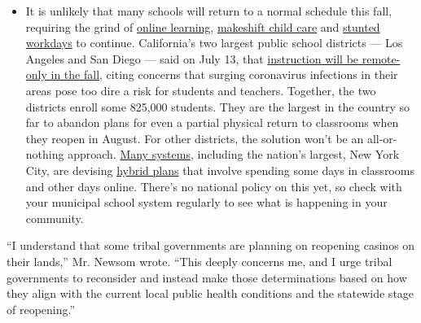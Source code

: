\begin{itemize}
  \begin{itemize}
  \tightlist
  \item
    It is unlikely that many schools will return to a normal schedule
    this fall, requiring the grind of
    \href{https://www.nytimes.com/2020/06/05/us/coronavirus-education-lost-learning.html?action=click\&pgtype=Article\&state=default\&region=MAIN_CONTENT_3\&context=storylines_faq}{online
    learning},
    \href{https://www.nytimes.com/2020/05/29/us/coronavirus-child-care-centers.html?action=click\&pgtype=Article\&state=default\&region=MAIN_CONTENT_3\&context=storylines_faq}{makeshift
    child care} and
    \href{https://www.nytimes.com/2020/06/03/business/economy/coronavirus-working-women.html?action=click\&pgtype=Article\&state=default\&region=MAIN_CONTENT_3\&context=storylines_faq}{stunted
    workdays} to continue. California's two largest public school
    districts --- Los Angeles and San Diego --- said on July 13, that
    \href{https://www.nytimes.com/2020/07/13/us/lausd-san-diego-school-reopening.html?action=click\&pgtype=Article\&state=default\&region=MAIN_CONTENT_3\&context=storylines_faq}{instruction
    will be remote-only in the fall}, citing concerns that surging
    coronavirus infections in their areas pose too dire a risk for
    students and teachers. Together, the two districts enroll some
    825,000 students. They are the largest in the country so far to
    abandon plans for even a partial physical return to classrooms when
    they reopen in August. For other districts, the solution won't be an
    all-or-nothing approach.
    \href{https://bioethics.jhu.edu/research-and-outreach/projects/eschool-initiative/school-policy-tracker/}{Many
    systems}, including the nation's largest, New York City, are
    devising
    \href{https://www.nytimes.com/2020/06/26/us/coronavirus-schools-reopen-fall.html?action=click\&pgtype=Article\&state=default\&region=MAIN_CONTENT_3\&context=storylines_faq}{hybrid
    plans} that involve spending some days in classrooms and other days
    online. There's no national policy on this yet, so check with your
    municipal school system regularly to see what is happening in your
    community.
  \end{itemize}
\end{itemize}

``I understand that some tribal governments are planning on reopening
casinos on their lands,'' Mr. Newsom wrote. ``This deeply concerns me,
and I urge tribal governments to reconsider and instead make those
determinations based on how they align with the current local public
health conditions and the statewide stage of reopening.''


